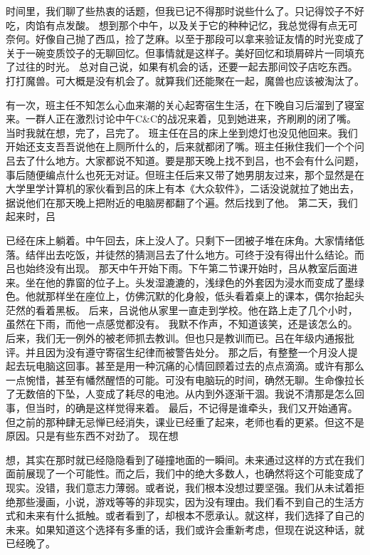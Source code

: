 \documentclass{article}
\begin{document}
\newpage 

时间里，我们聊了些热衷的话题，但我已记不得那时说些什么了。只记得饺子不好吃，肉馅有点发酸。 
想到那个中午，以及关于它的种种记忆，我总觉得有点无可奈何。好像自己抛了西瓜，捡了芝麻。以至于那段可以拿来验证友情的时光变成了关于一碗变质饺子的无聊回忆。但事情就是这样子。美好回忆和琐屑碎片一同填充了过往的时光。 
总对自己说，如果有机会的话，还要一起去那间饺子店吃东西。打打魔兽。可大概是没有机会了。就算我们还能聚在一起，魔兽也应该被淘汰了。 

有一次，班主任不知怎么心血来潮的关心起寄宿生生活，在下晚自习后溜到了寝室来。一群人正在激烈讨论中午C&C的战况来着，见到她进来，齐刷刷的闭了嘴。当时我就在想，完了，吕完了。 
班主任在吕的床上坐到熄灯也没见他回来。我们开始还支支吾吾说他在上厕所什么的，后来就都闭了嘴。班主任揪住我们一个个问吕去了什么地方。大家都说不知道。要是那天晚上找不到吕，也不会有什么问题，事后随便编点什么也死无对证。但班主任后来又带了她男朋友过来，那个显然是在大学里学计算机的家伙看到吕的床上有本《大众软件》，二话没说就拉了她出去，据说他们在那天晚上把附近的电脑房都翻了个遍。然后找到了他。 
第二天，我们起来时，吕

\newpage 

已经在床上躺着。中午回去，床上没人了。只剩下一团被子堆在床角。大家情绪低落。结伴出去吃饭，并徒然的猜测吕去了什么地方。可终于没有得出什么结论。而吕也始终没有出现。 
那天中午开始下雨。下午第二节课开始时，吕从教室后面进来。坐在他的靠窗的位子上。头发湿漉漉的，浅绿色的外套因为浸水而变成了墨绿色。他就那样坐在座位上，仿佛沉默的化身般，低头看着桌上的课本，偶尔抬起头茫然的看着黑板。 
后来，吕说他从家里一直走到学校。他在路上走了几个小时，虽然在下雨，而他一点感觉都没有。 
我默不作声，不知道该笑，还是该怎么的。 
后来，我们无一例外的被老师抓去教训。但也只是教训而已。吕在年级内通报批评。并且因为没有遵守寄宿生纪律而被警告处分。 
那之后，有整整一个月没人提起去玩电脑这回事。甚至是用一种沉痛的心情回顾着过去的点点滴滴。或许有那么一点惋惜，甚至有幡然醒悟的可能。可没有电脑玩的时间，确然无聊。生命像拉长了无数倍的下坠，人变成了耗尽的电池。从内到外逐渐干涸。我说不清那是怎么回事，但当时，的确是这样觉得来着。 
最后，不记得是谁牵头，我们又开始通宵。但之前的那种肆无忌惮已经消失，课业已经重了起来，老师也看的更紧。但这不是原因。只是有些东西不对劲了。 
现在想

\newpage 

想，其实在那时就已经隐隐看到了碰撞地面的一瞬间。未来通过这样的方式在我们面前展现了一个可能性。而之后，我们中的绝大多数人，也确然将这个可能变成了现实。没错，我们意志力薄弱。或者说，我们根本没想过要坚强。我们从未试着拒绝那些漫画，小说，游戏等等的非现实，因为没有理由。我们看不到自己的生活方式和未来有什么抵触。或者看到了，却根本不愿承认。就这样，我们选择了自己的未来。如果知道这个选择有多重的话，我们或许会重新考虑，但现在说这种话，就已经晚了。 
\end{document}

